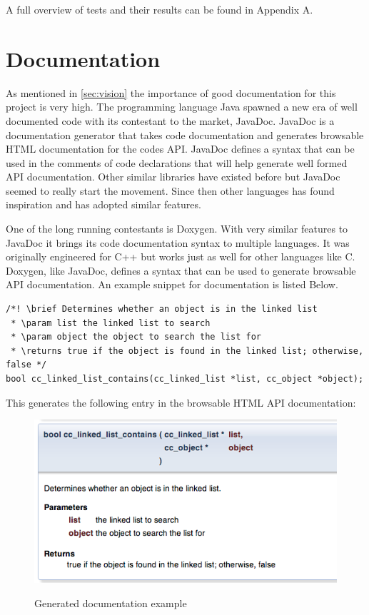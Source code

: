 \documentclass[table]{ituthesis}
\begin{document}
	A full overview of tests and their results can be found in Appendix A.
	
\section{Documentation}

As mentioned in \autoref{sec:vision} the importance of good documentation for this project is very high. The programming language Java spawned a new era of well documented code with its contestant to the market, JavaDoc. JavaDoc is a documentation generator that takes code documentation and generates browsable HTML documentation for the codes API. JavaDoc defines a syntax that can be used in the comments of code declarations that will help generate well formed API documentation. Other similar libraries have existed before but JavaDoc seemed to really start the movement. Since then other languages has found inspiration and has adopted similar features.

One of the long running contestants is Doxygen. With very similar features to JavaDoc it brings its code documentation syntax to multiple languages. It was originally engineered for C++ but works just as well for other languages like C. Doxygen, like JavaDoc, defines a syntax that can be used to generate browsable API documentation. An example snippet for documentation is listed Below.


\begin{lstlisting}[label=documentation-example,caption=Example of Doxygen comment]
/*! \brief Determines whether an object is in the linked list
 * \param list the linked list to search
 * \param object the object to search the list for
 * \returns true if the object is found in the linked list; otherwise, false */
bool cc_linked_list_contains(cc_linked_list *list, cc_object *object);
\end{lstlisting}


This generates the following entry in the browsable HTML API documentation:

	\begin{figure}[ht!]
		\begin{center}
			\includegraphics[scale=0.6]{images/doxygen_example.png}
			\label{fig:doxygen_example}
			\caption{Generated documentation example}
		\end{center}
	\end{figure}
	
\end{document}
